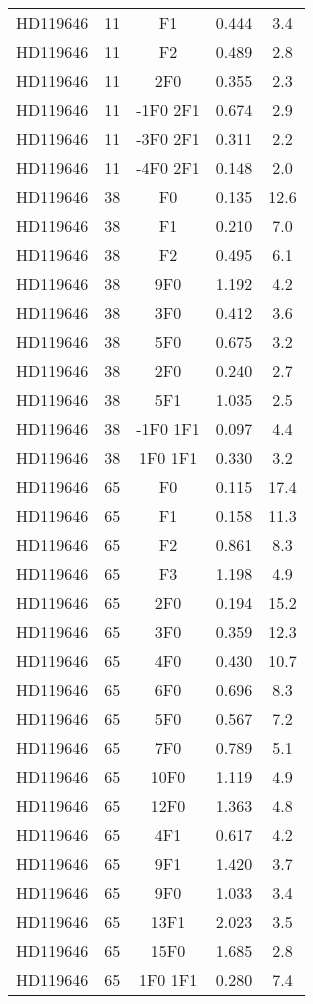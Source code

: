 \begin{table*}
\begin{tabular}{l c c c c}
HD119646 & 11 & F1 & 0.444 & 3.4\\ 
HD119646 & 11 & F2 & 0.489 & 2.8\\ 
HD119646 & 11 & 2F0 & 0.355 & 2.3\\ 
HD119646 & 11 & -1F0 2F1 & 0.674 & 2.9\\ 
HD119646 & 11 & -3F0 2F1 & 0.311 & 2.2\\ 
HD119646 & 11 & -4F0 2F1 & 0.148 & 2.0\\ 
\hline
HD119646 & 38 & F0 & 0.135 & 12.6\\ 
HD119646 & 38 & F1 & 0.210 & 7.0\\ 
HD119646 & 38 & F2 & 0.495 & 6.1\\ 
HD119646 & 38 & 9F0 & 1.192 & 4.2\\ 
HD119646 & 38 & 3F0 & 0.412 & 3.6\\ 
HD119646 & 38 & 5F0 & 0.675 & 3.2\\ 
HD119646 & 38 & 2F0 & 0.240 & 2.7\\ 
HD119646 & 38 & 5F1 & 1.035 & 2.5\\ 
HD119646 & 38 & -1F0 1F1 & 0.097 & 4.4\\ 
HD119646 & 38 & 1F0 1F1 & 0.330 & 3.2\\ 
\hline
HD119646 & 65 & F0 & 0.115 & 17.4\\ 
HD119646 & 65 & F1 & 0.158 & 11.3\\ 
HD119646 & 65 & F2 & 0.861 & 8.3\\ 
HD119646 & 65 & F3 & 1.198 & 4.9\\ 
HD119646 & 65 & 2F0 & 0.194 & 15.2\\ 
HD119646 & 65 & 3F0 & 0.359 & 12.3\\ 
HD119646 & 65 & 4F0 & 0.430 & 10.7\\ 
HD119646 & 65 & 6F0 & 0.696 & 8.3\\ 
HD119646 & 65 & 5F0 & 0.567 & 7.2\\ 
HD119646 & 65 & 7F0 & 0.789 & 5.1\\ 
HD119646 & 65 & 10F0 & 1.119 & 4.9\\ 
HD119646 & 65 & 12F0 & 1.363 & 4.8\\ 
HD119646 & 65 & 4F1 & 0.617 & 4.2\\ 
HD119646 & 65 & 9F1 & 1.420 & 3.7\\ 
HD119646 & 65 & 9F0 & 1.033 & 3.4\\ 
HD119646 & 65 & 13F1 & 2.023 & 3.5\\ 
HD119646 & 65 & 15F0 & 1.685 & 2.8\\ 
HD119646 & 65 & 1F0 1F1 & 0.280 & 7.4\\ 

\end{tabular}
\end{table*}
